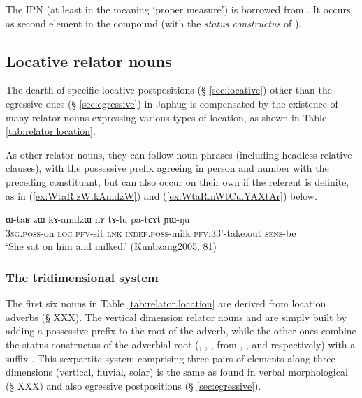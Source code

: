 The IPN   (at least in the meaning `proper measure') is borrowed from . It occurs as second element in the compound (with the \textit{status constructus}  of ).

\subsection{Locative relator nouns} \label{sec:relator.location}
The dearth of specific locative postpositions (§ \ref{sec:locative}) other than the egressive ones (§ \ref{sec:egressive}) in Japhug is compensated by the existence of many relator nouns expressing various types of location, as shown in Table \ref{tab:relator.location}. 

As other relator nouns, they can follow noun phrases (including headless relative clauses), with the possessive prefix agreeing in person and number with the preceding constituant, but can also occur on their own if the referent is definite, as  in (\ref{ex:WtaR.zW.kAmdzW}) and (\ref{ex:WtaR.nWtCu.YAXtAr}) below.

\begin{exe}
\ex \label{ex:WtaR.zW.kAmdzW}
\gll  ɯ-taʁ zɯ kɤ-amdzɯ nɤ tɤ-lu pa-tɕɤt ɲɯ-ŋu\\
\textsc{3sg}.\textsc{poss}-on \textsc{loc} \textsc{pfv}-sit \textsc{lnk} \textsc{indef}.\textsc{poss}-milk \textsc{pfv}:3\fl{}3'-take.out \textsc{sens}-be\\
\glt `She sat on him and milked.' (Kunbzang2005, 81)
\end{exe}

 

\subsubsection{The tridimensional system} \label{sec:relator.nouns.3d}

The first six nouns in Table \ref{tab:relator.location} are derived from location adverbs (§ XXX). The vertical dimension relator nouns  and  are simply built by adding a possessive prefix to the root of the adverb, while the other ones combine the status constructus of the adverbial root (, , ,  from , ,  and  respectively) with a suffix . This sexpartite system comprising three pairs of elements along three dimensions (vertical, fluvial, solar) is the same as found in verbal morphological (§ XXX) and also egressive postpositions (§ \ref{sec:egressive}).



